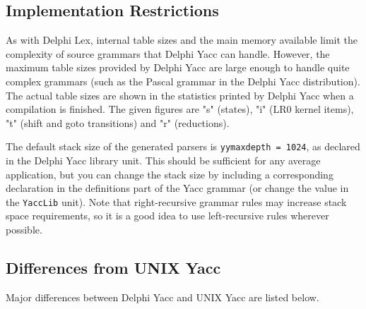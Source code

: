 \documentclass{article}
\begin{document}
\subsection{Implementation Restrictions}

As with Delphi Lex, internal table sizes and the main memory available limit the
complexity of source grammars that Delphi Yacc can handle. However, the maximum
table sizes provided by Delphi Yacc are large enough to handle quite complex
grammars (such as the Pascal grammar in the Delphi Yacc distribution). The actual
table sizes are shown in the statistics printed by Delphi Yacc when a compilation
is finished. The given figures are "s" (states), "i" (LR0 kernel items), "t"
(shift and goto transitions) and "r" (reductions).

The default stack size of the generated parsers is \verb"yymaxdepth = 1024",
as declared in the Delphi Yacc library unit. This should be sufficient for any
average application, but you can change the stack size by including a
corresponding declaration in the definitions part of the Yacc grammar
(or change the value in the \verb"YaccLib" unit). Note that right-recursive
grammar rules may increase stack space requirements, so it is a good
idea to use left-recursive rules wherever possible.

\subsection{Differences from UNIX Yacc}

Major differences between Delphi Yacc and UNIX Yacc are listed below.
\end{document}
